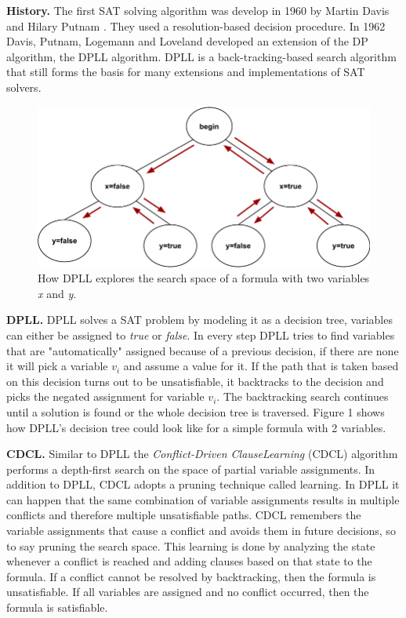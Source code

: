 \documentclass[letterpaper]{article}
\newcommand{\mypar}[1]{{\bf #1.}}
\begin{document}
\mypar{History}
The first SAT solving algorithm was develop in 1960 by Martin Davis and Hilary Putnam \cite{dp}.
They used a resolution-based decision procedure.
In 1962 Davis, Putnam, Logemann and Loveland developed an extension of the DP algorithm, the DPLL algorithm.
DPLL is a back-tracking-based search algorithm that still forms the basis for many extensions and implementations of SAT solvers.
\begin{figure}
	\centering
	\includegraphics[width=\columnwidth]{figures/dpll_branching.pdf}
	\caption{How DPLL explores the search space of a formula with two variables \textit{x} and \textit{y}.
		\label{fig:dpll-branching}}
\end{figure}

\mypar{DPLL}
DPLL solves a SAT problem by modeling it as a decision tree, variables can either be assigned to \textit{true} or \textit{false}.
In every step DPLL tries to find variables that are "automatically" assigned because of a previous decision,
if there are none it will pick a variable $v_i$ and assume a value for it.
If the path that is taken based on this decision turns out to be unsatisfiable, it backtracks to the decision and picks the negated assignment for variable $v_i$.
The backtracking search continues until a solution is found or the whole decision tree is traversed.
Figure 1 shows how DPLL's decision tree could look like for a simple formula with 2 variables.

\mypar{CDCL}
Similar to DPLL the \textit{Conflict-Driven Clause}\linebreak\textit{Learning} (CDCL) algorithm performs a depth-first search on the space of partial variable assignments.
In addition to DPLL, CDCL adopts a pruning technique called learning.
In DPLL it can happen that the same combination of variable assignments results in multiple conflicts and therefore multiple unsatisfiable paths.
CDCL remembers the variable assignments that cause a conflict and avoids them in future decisions, so to say pruning the search space.
This learning is done by analyzing the state whenever a conflict is reached and adding clauses based on that state to the formula.
If a conflict cannot be resolved by backtracking, then the formula is unsatisfiable.
If all variables are assigned and no conflict occurred, then the formula is satisfiable.
\end{document}
